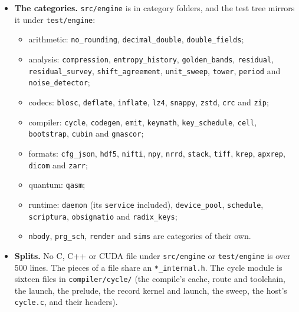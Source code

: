 \begin{enumerate}
\begin{itemize}
\item \textbf{The categories.} \texttt{src/\allowbreak{}engine} is in category folders, and the test tree mirrors it under \texttt{test/\allowbreak{}engine}:

\begin{itemize}
\item arithmetic: \texttt{no\_\allowbreak{}rounding}, \texttt{decimal\_\allowbreak{}double}, \texttt{double\_\allowbreak{}fields};
\item analysis: \texttt{compression}, \texttt{entropy\_\allowbreak{}history}, \texttt{golden\_\allowbreak{}bands}, \texttt{residual}, \texttt{residual\_\allowbreak{}survey}, \texttt{shift\_\allowbreak{}agreement}, \texttt{unit\_\allowbreak{}sweep}, \texttt{tower}, \texttt{period} and \texttt{noise\_\allowbreak{}detector};
\item codecs: \texttt{blosc}, \texttt{deflate}, \texttt{inflate}, \texttt{lz4}, \texttt{snappy}, \texttt{zstd}, \texttt{crc} and \texttt{zip};
\item compiler: \texttt{cycle}, \texttt{codegen}, \texttt{emit}, \texttt{keymath}, \texttt{key\_\allowbreak{}schedule}, \texttt{cell}, \texttt{bootstrap}, \texttt{cubin} and \texttt{gnascor};
\item formats: \texttt{cfg\_\allowbreak{}json}, \texttt{hdf5}, \texttt{nifti}, \texttt{npy}, \texttt{nrrd}, \texttt{stack}, \texttt{tiff}, \texttt{krep}, \texttt{apxrep}, \texttt{dicom} and \texttt{zarr};
\item quantum: \texttt{qasm};
\item runtime: \texttt{daemon} (its \texttt{service} included), \texttt{device\_\allowbreak{}pool}, \texttt{schedule}, \texttt{scriptura}, \texttt{obsignatio} and \texttt{radix\_\allowbreak{}keys};
\item \texttt{nbody}, \texttt{prg\_\allowbreak{}sch}, \texttt{render} and \texttt{sims} are categories of their own.
\end{itemize}
\item \textbf{Splits.} No C, C++ or CUDA file under \texttt{src/\allowbreak{}engine} or \texttt{test/\allowbreak{}engine} is over 500 lines. The pieces of a file share an \texttt{*\_\allowbreak{}internal.\allowbreak{}h}. The cycle module is sixteen files in \texttt{compiler/\allowbreak{}cycle/\allowbreak{}} (the compile's cache, route and toolchain, the launch, the prelude, the record kernel and launch, the sweep, the host's \texttt{cycle.\allowbreak{}c}, and their headers).

\end{itemize}
\end{enumerate}

